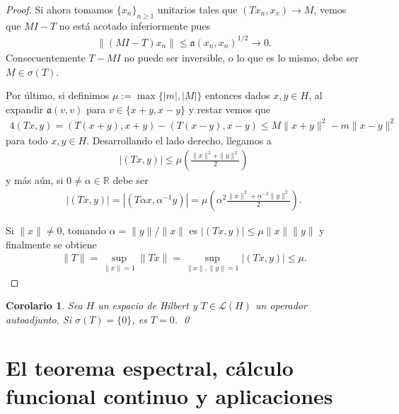 \documentclass[11pt]{report}
\theoremstyle{colored}
\newtheorem{corollary}{Corolario}[section]
\newcommand{\R}{\mathbb{R}}
\newcommand{\ip}[1]{( #1 )}
\begin{document}
\begin{proof}
Si ahora tomamos $\{x_n\}_{n \geq 1}$ unitarios tales que $\ip{Tx_n,x_x} \to M$, vemos que $MI-T$ no está acotado inferiormente pues
\begin{align*}
\|(M I -T )x_n\| \leq \mathfrak{a}(x_n,x_n)^{1/2} \to 0.
\end{align*}
Consecuentemente $T-M I$ no puede ser inversible, o lo que es lo mismo, debe ser $M \in \sigma(T)$.

Por último, si definimos $\mu := \max\{|m|,|M|\}$ entonces dados $x,y \in H$, al expandir $\mathfrak{a}(v,v)$ para $v \in \{x+y,x-y\}$ y restar vemos que
\begin{align*}
4\ip{Tx,y}  = \ip{T(x+y),x+y}-\ip{T(x-y),x-y} \leq M\|x+y\|^2 - m\|x-y\|^2
\end{align*}
para todo $x,y \in H$. Desarrollando el lado derecho, llegamos a 
\begin{align*}
|\ip{Tx,y}| \leq \mu \left(\frac{\|x\|^2 + \|y\|^2}{2}\right)
\end{align*}
y más aún, si $0 \neq \alpha \in \R$ debe ser
\begin{align*}
|\ip{Tx,y}| = |\ip{T\alpha x, \alpha^{-1}y}| = \mu \left(\alpha^2\frac{\|x\|^2 + \alpha^{-2}\|y\|^2}{2}\right).
\end{align*}

Si $\|x\| \neq 0$, tomando $\alpha = \|y\|/\|x\|$ es $|\ip{Tx,y}| \leq \mu \|x\|\|y\|$ y finalmente se obtiene
\begin{align*}
\|T\| = \sup_{\|x\| = 1}\|Tx\| = \sup_{\|x\|,\|y\| = 1} |(Tx,y)| \leq \mu.
\end{align*}
\end{proof}

\begin{corollary} Sea $H$ un espacio de Hilbert y $T \in \mathscr{L}(H)$ un operador autoadjunto. Si $\sigma(T) = \{0\}$, es $T = 0$. \qed
\end{corollary}

\chapter{El teorema espectral, cálculo funcional continuo y aplicaciones}
\end{document}
